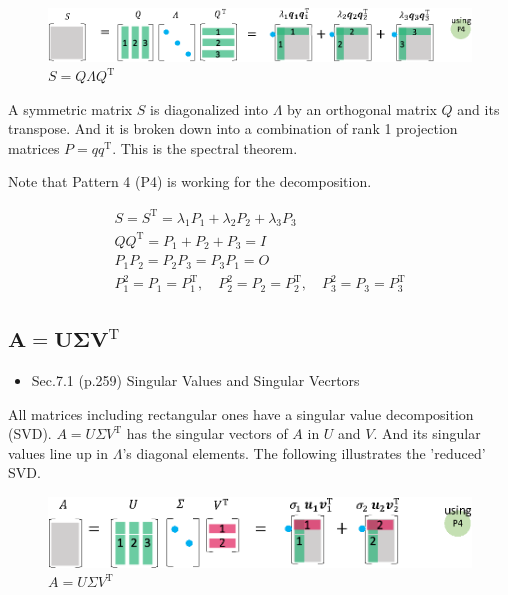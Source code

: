 \documentclass[letterpaper]{article}
\DeclareRobustCommand\transp{^{\mathrm{T}}}
\begin{document}
\begin{figure}[H]
  \centering
  \includegraphics[scale=0.8]{EVD.eps}
  \caption{$S=Q \Lambda Q\transp$}
\end{figure}

A symmetric matrix $S$ is diagonalized into $\Lambda$  by an orthogonal matrix $Q$
and its transpose. And it is broken down into a combination of rank 1 projection matrices $P=qq\transp$.
This is the spectral theorem.

Note that Pattern 4 (P4) is working for the decomposition.

\begin{gather*}
  S=S\transp = \lambda_1 P_1 + \lambda_2 P_2 + \lambda_3 P_3\\
  QQ\transp = P_1 + P_2 + P_3 = I \\
  P_1 P_2 = P_2 P_3 = P_3 P_1 = O\\
  P_1^2 =P_1=P_1\transp, \quad P_2^2=P_2=P_2\transp, \quad P_3^2=P_3=P_3\transp
\end{gather*}

\subsection{$\boldsymbol{A=U \Sigma V\transp}$}


\begin{itemize}
  \item Sec.7.1 (p.259) Singular Values and Singular Vecrtors
\end{itemize}

All matrices including rectangular ones have a singular value decomposition (SVD).
$A=U \Sigma V\transp$ has the singular vectors of $A$ in $U$ and $V$.
And its singular values line up in $\Lambda$'s diagonal elements.
The following illustrates the 'reduced' SVD.


\begin{figure}[H]
  \centering
  \includegraphics[scale=0.8]{SVD.eps}
  \caption{$A=U \Sigma V\transp$}
\end{figure}
\end{document}
